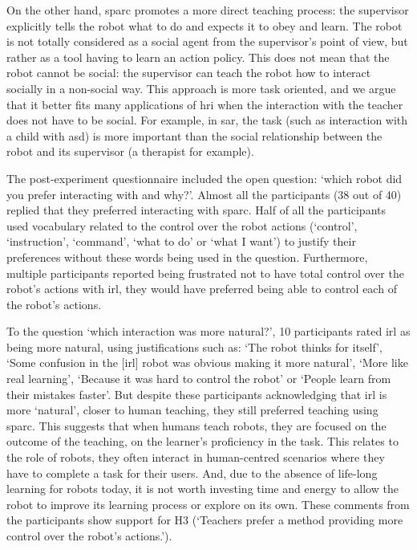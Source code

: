 On the other hand, \gls{sparc} promotes a more direct teaching process: the supervisor explicitly tells the robot what to do and expects it to obey and learn. The robot is not totally considered as a social agent from the supervisor's point of view, but rather as a tool having to learn an action policy. This does not mean that the robot cannot be social: the supervisor can teach the robot how to interact socially in a non-social way. This approach is more task oriented, and we argue that it better fits many applications of \gls{hri} when the interaction with the teacher does not have to be social. For example, in \gls{sar}, the task (such as interaction with a child with \gls{asd}) is more important than the social relationship between the robot and its supervisor (a therapist for example).

The post-experiment questionnaire included the open question: `which robot did you prefer interacting with and why?'. Almost all the participants (38 out of 40) replied that they preferred interacting with \gls{sparc}. Half of all the participants used vocabulary related to the control over the robot actions (`control', `instruction', `command', `what to do' or `what I want') to justify their preferences without these words being used in the question. Furthermore, multiple participants reported being frustrated not to have total control over the robot's actions with \gls{irl}, they would have preferred being able to control each of the robot's actions. 

To the question `which interaction was more natural?', 10 participants rated \gls{irl} as being more natural, using justifications such as: `The robot thinks for itself', `Some confusion in the [\gls{irl}] robot was obvious making it more natural', `More like real learning', `Because it was hard to control the robot' or `People learn from their mistakes faster'. But despite these participants acknowledging that \gls{irl} is more `natural', closer to human teaching, they still preferred teaching using \gls{sparc}. This suggests that when humans teach robots, they are focused on the outcome of the teaching, on the learner's proficiency in the task. This relates to the role of robots, they often interact in human-centred scenarios where they have to complete a task for their users. And, due to the absence of life-long learning for robots today, it is not worth investing time and energy to allow the robot to improve its learning process or explore on its own. These comments from the participants show support for H3 (`Teachers prefer a method providing more control over the robot's actions.').

